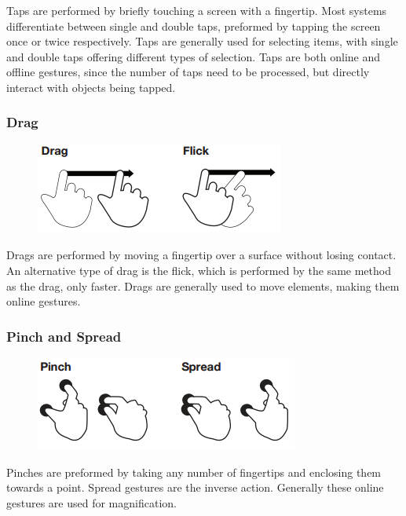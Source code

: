 \documentclass[11pt]{report}
\begin{document}
Taps are performed by briefly touching a screen with a fingertip. 
Most systems differentiate between single and double taps, preformed by tapping the screen once or twice respectively.
Taps are generally used for selecting items, with single and double taps offering different types of selection.
Taps are both online and offline gestures, since the number of taps need to be processed, but directly interact with objects being tapped.

\subsubsection{Drag}

\begin{figure}
\includegraphics[width=\textwidth]{Drags}
\end{figure}

Drags are performed by moving a fingertip over a surface without losing contact. 
An alternative type of drag is the flick, which is performed by the same method as the drag, only faster.
Drags are generally used to move elements, making them online gestures.

\subsubsection{Pinch and Spread}

\begin{figure}
\includegraphics[width=\textwidth]{Pinch}
\end{figure}

Pinches are preformed by taking any number of fingertips and enclosing them towards a point. Spread gestures are the inverse action. Generally these online gestures are used for magnification.
\end{document}
